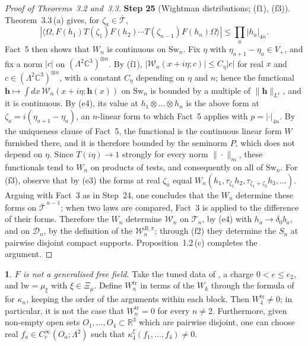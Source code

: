 \documentclass[11pt]{amsart}
\newcommand{\namedhead}{}
\theoremstyle{definition}
\newtheorem*{namedinner}{\namedhead}
\newenvironment{named}[1]{\renewcommand{\namedhead}{#1}\begin{namedinner}}{\end{namedinner}}
\begin{document}
\begin{proof}[Proof of Theorems~3.2 and~3.3]
\textbf{Step 25} (Wightman distributions; (f1), (f3)).
Theorem~3.3\,(a) gives, for $\zeta_a\in\overline{\mathcal T}$,
\begin{equation*}
|\langle\Omega,F(h_1)T(\zeta_1)F(h_2)\cdots T(\zeta_{n-1})F(h_n)\Omega\rangle|\le\prod_a|h_a|_{4n}.
\end{equation*}
Fact~5 then shows that $W_n$ is continuous on $\mathrm{Sw}_n$.
Fix $\eta$ with $\eta_{a+1}-\eta_a\in V_+$, and fix a norm $|c|$ on $(\Lambda^2\mathbb C^3)^{\otimes n}$.
By (f1), $|\mathcal W_n(x+i\eta;c)|\le C_\eta|c|$ for real $x$ and $c\in(\Lambda^2\mathbb C^3)^{\otimes n}$, with a constant $C_\eta$ depending on $\eta$ and $n$; hence the functional $\mathbf h\mapsto\int dx\,\mathcal W_n(x+i\eta;\mathbf h(x))$ on $\mathrm{Sw}_n$ is bounded by a multiple of $\|\mathbf h\|_{L^1}$, and it is continuous.
By (e4), its value at $h_1\otimes\dots\otimes h_n$ is the above form at $\zeta_a=i(\eta_{a+1}-\eta_a)$, an $n$-linear form to which Fact~5 applies with $p=|\cdot|_{4n}$.
By the uniqueness clause of Fact~5, the functional is the continuous linear form $W$ furnished there, and it is therefore bounded by the seminorm $P$, which does not depend on $\eta$.
Since $T(i\eta)\to1$ strongly for every norm $\|\cdot\|_m$, these functionals tend to $W_n$ on products of tests, and consequently on all of $\mathrm{Sw}_n$.
For (f3), observe that by (e3) the forms at real $\zeta_a$ equal $W_n(h_1,\tau_{\zeta_1}h_2,\tau_{\zeta_1+\zeta_2}h_3,\dots)$.
Arguing with Fact~3 as in Step~24, one concludes that the $W_n$ determine these forms on $\overline{\mathcal T}^{\,n-1}$; when two laws are compared, Fact~3 is applied to the difference of their forms.
Therefore the $W_n$ determine $\mathcal W_n$ on $\mathcal T_n$, by (e4) with $h_a\to\delta_0b_a$, and on $\mathcal D_n$, by the definition of the $\mathcal W_n^{R,\pi}$; through (f2) they determine the $S_n$ at pairwise disjoint compact supports.
Proposition~1.2\,(c) completes the argument.
\end{proof}

\begin{named}{Corollary 3.4}
\emph{$F$ is not a generalised free field.}
Take the tuned data of \cite[Theorem~44]{QEDIII}, a charge $0<e\le e_2$, and $\mathrm{lw}=\mu_\xi$ with $\xi\in\Xi_\mu$.
Define $W_n^{\mathrm{tr}}$ in terms of the $W_k$ through the formula of \cite[(n5)]{QEDIII} for $\kappa_n$, keeping the order of the arguments within each block.
Then $W_4^{\mathrm{tr}}\ne0$; in particular, it is not the case that $W_n^{\mathrm{tr}}=0$ for every $n\ne2$.
Furthermore, given non-empty open sets $O_1,\dots,O_4\subset\mathbb R^3$ which are pairwise disjoint, one can choose real $f_a\in C_c^\infty(O_a;\Lambda^2)$ such that $\kappa_4^\xi(f_1,\dots,f_4)\ne0$.
\end{named}
\end{document}
